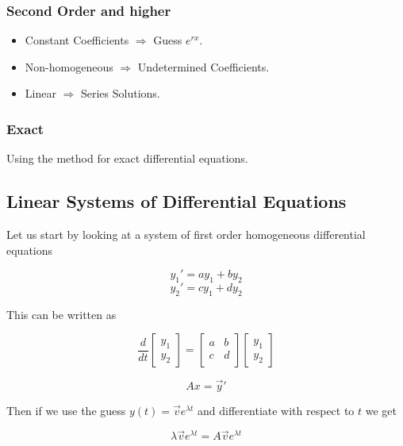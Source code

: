 \subsubsection{Second Order and higher}

\begin{itemize}

    \item Constant Coefficients \(\Rightarrow\) Guess \(e^{rx}\).

    \item Non-homogeneous \(\Rightarrow\) Undetermined Coefficients.

    \item Linear \(\Rightarrow\) Series Solutions.

\end{itemize}

\subsubsection{Exact}

Using the method for exact differential equations.

\subsection{Linear Systems of Differential Equations}

Let us start by looking at a system of first order homogeneous differential equations

\[
    y_1 ' = ay_1 + by_2
\]
\[
    y_2 ' = cy_1 + dy_2
\]

This can be written as 

\[
    \frac{d}{dt} 
    \begin{bmatrix} 
    y_1 \\ 
    y_2 
    \end{bmatrix} 
    = 
    \begin{bmatrix}
    a & b \\
    c & d \\
    \end{bmatrix} 
    \begin{bmatrix}
    y_1 \\ 
    y_2
    \end{bmatrix}
\]

\[
    Ax = \vec{y}'
\]

Then if we use the guess \(y(t) = \vec{v} e^{\lambda t}\) and differentiate with respect to \(t\) 
we get 

\[
    \lambda \vec{v} e^{\lambda t} = A \vec{v} e^{\lambda t}
\]

